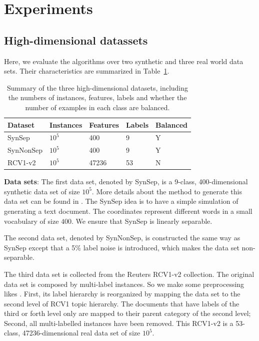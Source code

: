 \documentclass[preprint,12pt,authoryear]{elsarticle}
\begin{document}
\section{Experiments}

\subsection{High-dimensional datassets}
\label{subsec:BPAE}
Here, we evaluate the algorithms over two synthetic and three real world data sets. Their characteristics are summarized in Table~\ref{table:mce}.

\begin{table}[h]
	\caption{Summary of the three high-dimensional datasets, including the numbers of instances, features, labels and whether the number of examples in each class are balanced.}
	\label{table:mce}
	\begin{center}
		\begin{tabular}{l l l l l}
			{\bf Dataset}  & {\bf Instances} & {\bf Features} & {\bf Labels}& {\bf Balanced}\\
			\hline
			SynSep & $10^5$ 	& 400 	& 9 & Y\\
			
			SynNonSep & $10^5$ & 400 	& 9 & Y\\
			
			RCV1-v2  & $10^5$ 	& 47236 	& 53 & N\\
			
			
		\end{tabular}
	\end{center}
\end{table}

\textbf{Data sets}:
The first data set, denoted by SynSep,  is a 9-class, 400-dimensional synthetic data set of size $10^5$. More details about the method to generate this data set can be found in \cite{kakade2008efficient}. The SynSep  idea is to have a simple simulation of generating a text document. The coordinates represent different words in a small vocabulary of size $400$. We ensure that SynSep is linearly separable. 

The second data set, denoted by SynNonSep, is constructed  the same way as  SynSep except that a 5\% label noise is introduced, which makes the data set non-separable. 

The third data set is collected from the Reuters RCV1-v2 collection\cite{David04RCV}. The original data set is composed by multi-label instances. So we make some preprocessing likes \cite{RB08a}. First, its label hierarchy is reorganized by mapping the data set to the second level of RCV1 topic hierarchy. The documents that have labels of the third or forth level only are mapped to their parent category of the second level; Second, all multi-labelled instances have been removed. This RCV1-v2 is a 53-class,  47236-dimensional real data set of size $10^5$. 
\end{document}
